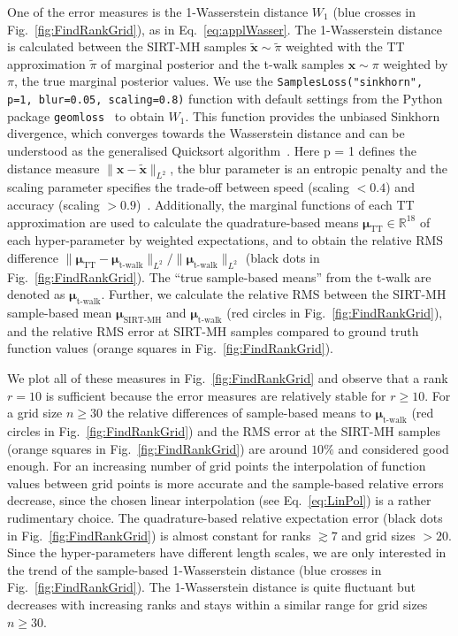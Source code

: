 One of the error measures is the 1-Wasserstein distance $W_1$ (blue crosses in Fig.~\ref{fig:FindRankGrid}), as in Eq.~\ref{eq:applWasser}.
The  1-Wasserstein distance is calculated between the SIRT-MH samples $\tilde{\bm{x}} \sim \tilde{\pi}$ weighted with the TT approximation $\tilde{\pi}$ of marginal posterior and the t-walk samples $\bm{x} \sim \pi$ weighted by $\pi$, the true marginal posterior values.
We use the \texttt{SamplesLoss("sinkhorn", p=1, blur=0.05, scaling=0.8)} function with default settings from the Python package \texttt{geomloss}~\cite{Wassersteinaccess} to obtain $W_1$.
This function provides the unbiased Sinkhorn divergence, which converges towards the Wasserstein distance and can be understood as the generalised Quicksort algorithm~\cite{feydy2020OT}.
Here p = 1 defines the distance measure $\lVert \bm{x} -\tilde{\bm{x}} \rVert_{L^2}$, the blur parameter is an entropic penalty and the scaling parameter specifies the trade-off between speed (scaling $< 0.4$) and accuracy (scaling $>0.9$)~\cite{Wassersteinaccess}.
Additionally, the marginal functions of each TT approximation are used to calculate the quadrature-based means $\bm{\mu}_{\text{TT}} \in \mathbb{R}^{18}$ of each hyper-parameter by weighted expectations, and to obtain the relative RMS difference $\lVert\bm{\mu}_{\text{TT}} - \bm{\mu}_{\text{t-walk}} \rVert_{L^2} / \lVert \bm{\mu}_{\text{t-walk}} \rVert_{L^2} $ (black dots in Fig.~\ref{fig:FindRankGrid}).
The ``true sample-based means'' from the t-walk are denoted as $\bm{\mu}_{\text{t-walk}}$.
Further, we calculate the relative RMS between the SIRT-MH sample-based mean $\bm{\mu}_{\text{SIRT-MH}}$ and $\bm{\mu}_{\text{t-walk}}$  (red circles in Fig.~\ref{fig:FindRankGrid}), and the relative RMS error at SIRT-MH samples compared to ground truth function values (orange squares in Fig.~\ref{fig:FindRankGrid}).

We plot all of these measures in Fig.~\ref{fig:FindRankGrid} and observe that a rank $r = 10$ is sufficient because the error measures are relatively stable for $r\geq10$.
For a grid size $n \geq 30$ the relative differences of sample-based means to $\bm{\mu}_{\text{t-walk}}$ (red circles in Fig.~\ref{fig:FindRankGrid}) and the RMS error at the SIRT-MH samples (orange squares in Fig.~\ref{fig:FindRankGrid}) are around $ 10\%$ and considered good enough.
For an increasing number of grid points the interpolation of function values between grid points is more accurate and the sample-based relative errors decrease, since the chosen linear interpolation (see Eq.~\ref{eq:LinPol}) is a rather rudimentary choice.
The quadrature-based relative expectation error (black dots in Fig.~\ref{fig:FindRankGrid}) is almost constant for ranks $ \gtrsim 7$ and grid sizes $ > 20$.
Since the hyper-parameters have different length scales, we are only interested in the trend of the sample-based 1-Wasserstein distance (blue crosses in Fig.~\ref{fig:FindRankGrid}).
The 1-Wasserstein distance is quite fluctuant but decreases with increasing ranks and stays within a similar range for grid sizes $n \geq 30$.


